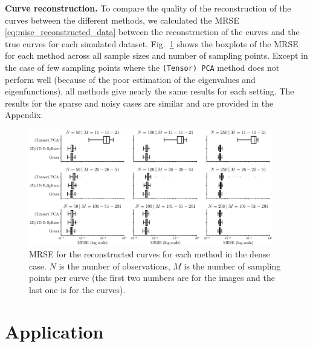 \documentclass[times,sort&compress,3p]{elsarticle}
\theoremstyle{plain}%
\theoremstyle{definition}
\newenvironment{results}[1][]{\noindent \textbf{#1} \rmfamily}{\medskip}
\begin{document}
\begin{results}[Curve reconstruction.]
To compare the quality of the reconstruction of the curves between the different methods, we calculated the MRSE \eqref{eq:mise_reconstructed_data} between the reconstruction of the curves and the true curves for each simulated dataset. Fig.~\ref{fig:mise_mfd_1d} shows the boxplots of the MRSE for each method across all sample sizes and number of sampling points. Except in the case of few sampling points where the \texttt{(Tensor) PCA} method does not perform well (because of the poor estimation of the eigenvalues and eigenfunctions), all methods give nearly the same results for each setting. The results for the sparse and noisy cases are similar and are provided in the Appendix.
\begin{figure}
     \centering
     \includegraphics[width=0.95\textwidth]{MRSE}
    \caption{MRSE for the reconstructed curves for each method in the dense case. $N$ is the number of observations, $M$ is the number of sampling points per curve (the first two numbers are for the images and the last one is for the curves).}
    \label{fig:mise_mfd_1d}
\end{figure}
\end{results}




\section{Application} %
\label{sec:application}
\end{document}
